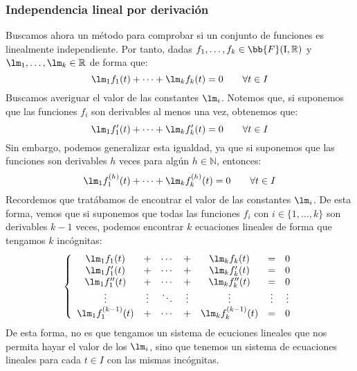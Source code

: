 \subsubsection{Independencia lineal por derivación}
Buscamos ahora un método para comprobar si un conjunto de funciones es linealmente independiente. Por tanto, dadas $f_1,\ldots,f_k\in \bb{F}(\text{I},\mathbb{R})$ y $\lm_1,\ldots,\lm_k\in \mathbb{R}$ de forma que:
\begin{equation*}
    \lm_1 f_1(t) + \cdots + \lm_k f_k(t) = 0 \qquad \forall t\in I
\end{equation*}
Buscamos averiguar el valor de las constantes $\lm_i$. Notemos que, si suponemos que las funciones $f_i$ son derivables al menos una vez, obtenemos que:
\begin{equation*}
    \lm_1 f_1'(t) + \cdots + \lm_k f_k'(t) = 0 \qquad \forall t\in I
\end{equation*}
Sin embargo, podemos generalizar esta igualdad, ya que si suponemos que las funciones son derivables $h$ veces para algún $h\in \mathbb{N}$, entonces:
\begin{equation*}
    \lm_1 f_1^{(h)}(t) + \cdots + \lm_k f_k^{(h)}(t) = 0 \qquad \forall t\in I
\end{equation*}
Recordemos que tratábamos de encontrar el valor de las constantes $\lm_i$. De esta forma, vemos que si suponemos que todas las funciones $f_i$ con $i \in \{1,\ldots,k\}$ son derivables $k-1$ veces, podemos encontrar $k$ ecuaciones lineales de forma que tengamos $k$ incógnitas:
\begin{equation*}
    \left\{\begin{array}{ccccccc}
            \lm_1 f_1(t) &+& \cdots &+& \lm_k f_k(t) &=& 0 \\
            \lm_1 f_1'(t) &+& \cdots &+& \lm_k f_k'(t) &=& 0 \\
            \lm_1 f_1''(t) &+& \cdots &+& \lm_k f_k''(t) &=& 0 \\
            \vdots & \vdots & \ddots & \vdots & \vdots & \vdots & \vdots \\
            \lm_1 f_1^{(k-1)}(t) &+& \cdots &+& \lm_k f_k^{(k-1)}(t) &=& 0 
    \end{array}\right.
\end{equation*}
De esta forma, no es que tengamos un sistema de ecuciones lineales que nos permita hayar el valor de los $\lm_i$, sino que tenemos un sistema de ecuaciones lineales para cada $t\in I$ con las mismas incógnitas.\\

